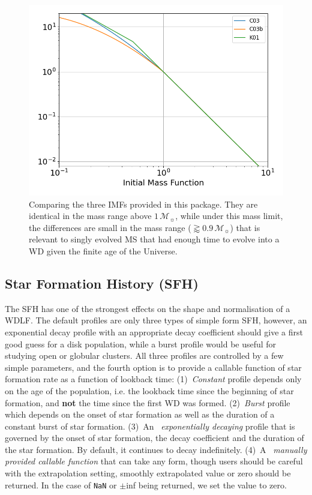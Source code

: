 \documentclass[fleqn,usenatbib]{rasti}
\newcommand{\msun}{\mathcal{M}_{\sun}}
\begin{document}
\begin{figure}
    \centering
    \includegraphics[width=\columnwidth]{imfs.png}
    \caption{Comparing the three IMFs provided in this package. They are
    identical in the mass range above $1\,\msun$, while under this mass
    limit, the differences are small in the mass range ($\gtrapprox0.9\,\msun$)
    that is relevant to singly evolved MS that had enough time to evolve into a
    WD given the finite age of the Universe.}
    \label{fig:imfs}
\end{figure}

\subsection{Star Formation History (SFH)}
The SFH has one of the strongest effects on the shape and normalisation of a
WDLF. The default profiles are only three types of simple form SFH, however,
an exponential decay profile with an appropriate decay coefficient should give a
first good guess for a disk population, while a burst profile would be useful
for studying open or globular clusters. All three profiles are controlled by
a few simple parameters, and the fourth option is to provide a callable
function of star formation rate as a function of lookback time:
(1)~\textit{Constant} profile depends only on the age of the population,
i.e. the lookback time since the beginning of star formation,
and \textbf{not} the time since the first WD was formed. (2)~\textit{Burst}
profile which depends on the onset of star formation as well as the duration
of a constant burst of star formation. (3)~An ~\textit{exponentially decaying}
profile that is governed by the onset of star formation, the decay coefficient
and the duration of the star formation. By default, it continues to decay
indefinitely. (4)~A ~\textit{manually provided callable function} that can take
any form, though users should be careful with the extrapolation setting,
smoothly extrapolated value or zero should be returned. In the case of \verb+NaN+
or $\pm$inf being returned, we set the value to zero.
\end{document}
